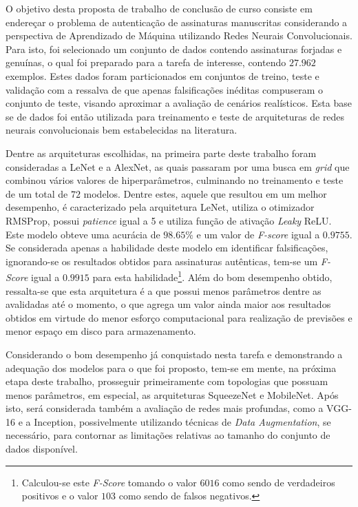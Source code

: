 
O objetivo desta proposta de trabalho de conclusão de curso consiste em endereçar o problema de autenticação de assinaturas manuscritas considerando a perspectiva de Aprendizado de Máquina utilizando Redes Neurais Convolucionais. Para isto, foi selecionado um conjunto de dados contendo assinaturas forjadas e genuínas, o qual foi preparado para a tarefa de interesse, contendo $27.962$ exemplos. Estes dados foram particionados em conjuntos de treino, teste e validação com a ressalva de que apenas falsificações inéditas compuseram o conjunto de teste, visando aproximar a avaliação de cenários realísticos. Esta base se de dados foi então utilizada para treinamento e teste de arquiteturas de redes neurais convolucionais bem estabelecidas na literatura.

Dentre as arquiteturas escolhidas, na primeira parte deste trabalho foram consideradas a LeNet e a AlexNet, as quais passaram por uma busca em \emph{grid} que combinou vários valores de hiperparâmetros, culminando no treinamento e teste de um total de $72$ modelos. Dentre estes, aquele que resultou em um melhor desempenho, é caracterizado pela arquitetura LeNet, utiliza o otimizador RMSProp, possui \emph{patience} igual a 5 e utiliza função de ativação \emph{Leaky} ReLU. Este modelo obteve uma acurácia de $98.65\%$ e um valor de \emph{F-score} igual a $0.9755$. Se considerada apenas a habilidade deste modelo em identificar falsificações, ignorando-se os resultados obtidos para assinaturas autênticas, tem-se um \emph{F-Score} igual a $0.9915$ para esta habilidade\footnote{Calculou-se este \emph{F-Score} tomando o valor $6016$ como sendo de verdadeiros positivos e o valor $103$ como sendo de falsos negativos.}. Além do bom desempenho obtido, ressalta-se que esta arquitetura é a que possui menos parâmetros dentre as avalidadas até o momento, o que agrega um valor ainda maior aos resultados obtidos em virtude do menor esforço computacional para realização de previsões e menor espaço em disco para armazenamento.

Considerando o bom desempenho já conquistado nesta tarefa e demonstrando a adequação dos modelos para o que foi proposto, tem-se em mente, na próxima etapa deste trabalho, prosseguir primeiramente com topologias que possuam menos parâmetros, em especial, as arquiteturas SqueezeNet e MobileNet. Após isto, será considerada também a avaliação de redes mais profundas, como a VGG-16 e a Inception, possivelmente utilizando técnicas de \emph{Data Augmentation}, se necessário, para contornar as limitações relativas ao tamanho do conjunto de dados disponível.


